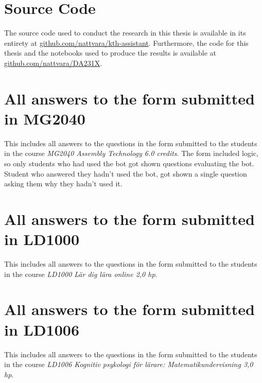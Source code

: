 ﻿\chapter{Source Code}
\label{appendix:source_code}


The source code used to conduct the research in this thesis is available in its entirety at \href{https://github.com/nattvara/kth-assistant}{github.com/nattvara/kth-assistant}. Furthermore, the code for this thesis and the notebooks used to produce the results is available at \href{https://github.com/nattvara/DA231X}{github.com/nattvara/DA231X}.


\chapter{All answers to the form submitted in MG2040}
\label{appendix:mg2040_form}


This includes all answers to the questions in the form submitted to the students in the course \textit{MG2040 Assembly Technology 6.0 credits}. The form included logic, so only students who had used the bot got shown questions evaluating the bot. Student who answered they hadn’t used the bot, got shown a single question asking them why they hadn’t used it.





\chapter{All answers to the form submitted in LD1000}
\label{appendix:ld1000_form}


This includes all answers to the questions in the form submitted to the students in the course \textit{LD1000 Lär dig lära online 2,0 hp}.





\chapter{All answers to the form submitted in LD1006}
\label{appendix:ld1006_form}


This includes all answers to the questions in the form submitted to the students in the course \textit{LD1006 Kognitiv psykologi för lärare: Matematikundervisning 3,0 hp}.





\cleardoublepage